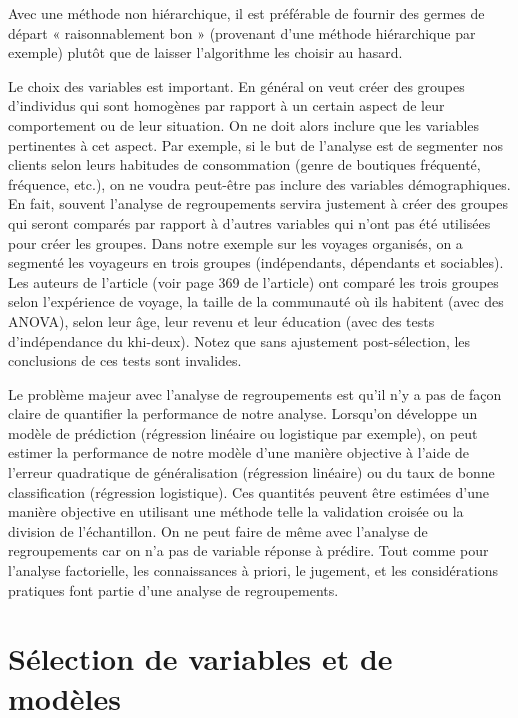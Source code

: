 \documentclass[
  11pt,
  letterpaper,
]{book}
\theoremstyle{definition}
\theoremstyle{definition}
\theoremstyle{definition}
\theoremstyle{remark}
\begin{document}
Avec une méthode non hiérarchique, il est préférable de fournir des germes de départ « raisonnablement bon » (provenant d'une méthode hiérarchique par exemple) plutôt que de laisser l'algorithme les choisir au hasard.

Le choix des variables est important. En général on veut créer des groupes d'individus qui sont homogènes par rapport à un certain aspect de leur comportement ou de leur situation. On ne doit alors inclure que les variables pertinentes à cet aspect. Par exemple, si le but de l'analyse est de segmenter nos clients selon leurs habitudes de consommation (genre de boutiques fréquenté, fréquence, etc.), on ne voudra peut-être pas inclure des variables démographiques. En fait, souvent l'analyse de regroupements servira justement à créer des groupes qui seront comparés par rapport à d'autres variables qui n'ont pas été utilisées pour créer les groupes. Dans notre exemple sur les voyages organisés, on a segmenté les voyageurs en trois groupes (indépendants, dépendants et sociables). Les auteurs de l'article (voir page 369 de l'article) ont comparé les trois groupes selon l'expérience de voyage, la taille de la communauté où ils habitent (avec des ANOVA), selon leur âge, leur revenu et leur éducation (avec des tests d'indépendance du khi-deux). Notez que sans ajustement post-sélection, les conclusions de ces tests sont invalides.

Le problème majeur avec l'analyse de regroupements est qu'il n'y a pas de façon claire de quantifier la performance de notre analyse. Lorsqu'on développe un modèle de prédiction (régression linéaire ou logistique par exemple), on peut estimer la performance de notre modèle d'une manière objective à l'aide de l'erreur quadratique de généralisation (régression linéaire) ou du taux de bonne classification (régression logistique). Ces quantités peuvent être estimées d'une manière objective en utilisant une méthode telle la validation croisée ou la division de l'échantillon. On ne peut faire de même avec l'analyse de regroupements car on n'a pas de variable réponse à prédire. Tout comme pour l'analyse factorielle, les connaissances à priori, le jugement, et les considérations pratiques font partie d'une analyse de regroupements.

\hypertarget{selection-modele}{%
\chapter{Sélection de variables et de modèles}\label{selection-modele}}
\end{document}

